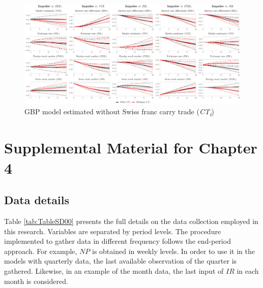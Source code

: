\documentclass[a4paper, twoside]{templates/ociamthesis}
\begin{document}
\begin{figure}[!ht]

{\centering \includegraphics[width=0.99\columnwidth]{figure/gGBP_COIRF_ROB1_ALL_FINAL} 

}

\caption{GBP model estimated without Swiss franc carry trade (\textit{CT\textsubscript{i}})}\label{fig:FigureD10}
\end{figure}

\hypertarget{appendixd}{%
\chapter{Supplemental Material for Chapter 4}\label{appendixd}}

\hypertarget{appendixd00}{%
\section{Data details}\label{appendixd00}}

Table \ref{tab:TableSD00} presents the full details on the data collection employed in this research. Variables are separated by period levels. The procedure implemented to gather data in different frequency follows the end-period approach. For example, \(NP\) is obtained in weekly levels. In order to use it in the models with quarterly data, the last available observation of the quarter is gathered. Likewise, in an example of the month data, the last input of \(IR\) in each month is considered.
\end{document}
